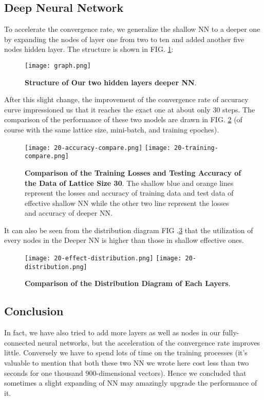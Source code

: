 \documentclass[prl,aps,twocolumn]{revtex4}
\begin{document}
	\subsection{Deep Neural Network}
		To accelerate the convergence rate, we generalize the shallow NN to a deeper one by expanding the nodes of layer one from two to ten and added another five nodes hidden layer. The structure is shown in FIG. \ref{fig:2.2}:\par
		\begin{figure}[!htp]
			\texttt{[image: graph.png]}
			\caption{{\bf Structure of Our two hidden layers deeper NN}.}
			\label{fig:2.2}
		\end{figure}
		After this slight change, the improvement of the convergence rate of accuracy curve impressioned us that it reaches the exact one at  about only $30$ steps. The comparison of the performance of these two models are drawn in FIG. \ref{fig:2.3} (of course with the same lattice size, mini-batch, and training epoches). 
		\begin{figure}[!htp]
			\texttt{[image: 20-accuracy-compare.png]}
			\texttt{[image: 20-training-compare.png]}
			\caption{{\bf Comparison of the Training Losses and Testing Accuracy of the Data of Lattice Size 30}. The shallow blue and orange lines represent the losses and accuracy of training data and test data of effective shallow NN while the other two line represent the losses and accuracy of deeper  NN.}
			\label{fig:2.3}
		\end{figure}
		It can also be seen from the distribution diagram FIG .\ref{fig:2.4} that the utilization of every nodes in the Deeper NN is higher than those in shallow effective ones.
		\begin{figure}[!htp]
			\texttt{[image: 20-effect-distribution.png]}
			\texttt{[image: 20-distribution.png]}
			\caption{{\bf Comparison of the Distribution Diagram of Each Layers}.}
			\label{fig:2.4}
		\end{figure}		
	\subsection{Conclusion}
		In fact, we have also tried to add more layers as well as nodes in our fully-connected neural networks, but the acceleration of the convergence rate improves little. Conversely we have to spend lots of time on the training processes (it's valuable to mention that both these two NN we wrote here cost less than two seconds for one thousand $900$-dimensional vectors). Hence we concluded that sometimes a slight expanding of NN may amazingly upgrade the performance of it.
\end{document}

